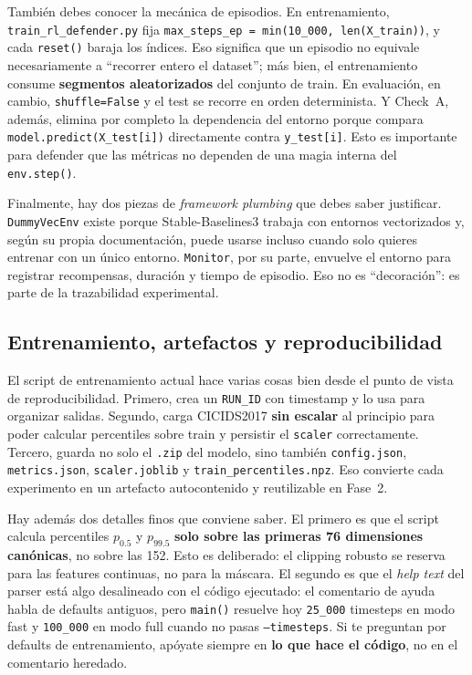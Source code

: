 ﻿\documentclass[12pt,a4paper]{article}
\begin{document}
También debes conocer la mecánica de episodios. En entrenamiento, \verb|train_rl_defender.py| fija
\texttt{max\_steps\_ep = min(10\_000, len(X\_train))}, y cada \texttt{reset()} baraja los índices.
Eso significa que un episodio no equivale necesariamente a ``recorrer entero el dataset''; más bien,
el entrenamiento consume \textbf{segmentos aleatorizados} del conjunto de train. En evaluación, en
cambio, \texttt{shuffle=False} y el test se recorre en orden determinista. Y Check~A, además,
elimina por completo la dependencia del entorno porque compara \verb|model.predict(X_test[i])|
directamente contra \verb|y_test[i]|. Esto es importante para defender que las métricas no dependen
de una magia interna del \texttt{env.step()}.

Finalmente, hay dos piezas de \textit{framework plumbing} que debes saber justificar.
\texttt{DummyVecEnv} existe porque Stable-Baselines3 trabaja con entornos vectorizados y, según su
propia documentación, puede usarse incluso cuando solo quieres entrenar con un único entorno.
\texttt{Monitor}, por su parte, envuelve el entorno para registrar recompensas, duración y tiempo
de episodio. Eso no es ``decoración'': es parte de la trazabilidad experimental.

\subsection{Entrenamiento, artefactos y reproducibilidad}

El script de entrenamiento actual hace varias cosas bien desde el punto de vista de reproducibilidad.
Primero, crea un \texttt{RUN\_ID} con timestamp y lo usa para organizar salidas. Segundo, carga
CICIDS2017 \textbf{sin escalar} al principio para poder calcular percentiles sobre train y persistir
el \texttt{scaler} correctamente. Tercero, guarda no solo el \texttt{.zip} del modelo, sino también
\texttt{config.json}, \texttt{metrics.json}, \texttt{scaler.joblib} y
\texttt{train\_percentiles.npz}. Eso convierte cada experimento en un artefacto autocontenido y
reutilizable en Fase~2.

Hay además dos detalles finos que conviene saber. El primero es que el script calcula percentiles
\(p_{0.5}\) y \(p_{99.5}\) \textbf{solo sobre las primeras 76 dimensiones canónicas}, no sobre las
152. Esto es deliberado: el clipping robusto se reserva para las features continuas, no para la
máscara. El segundo es que el \textit{help text} del parser está algo desalineado con el código
ejecutado: el comentario de ayuda habla de defaults antiguos, pero \texttt{main()} resuelve hoy
\texttt{25\_000} timesteps en modo fast y \texttt{100\_000} en modo full cuando no pasas
\texttt{--timesteps}. Si te preguntan por defaults de entrenamiento, apóyate siempre en \textbf{lo
que hace el código}, no en el comentario heredado.
\end{document}
